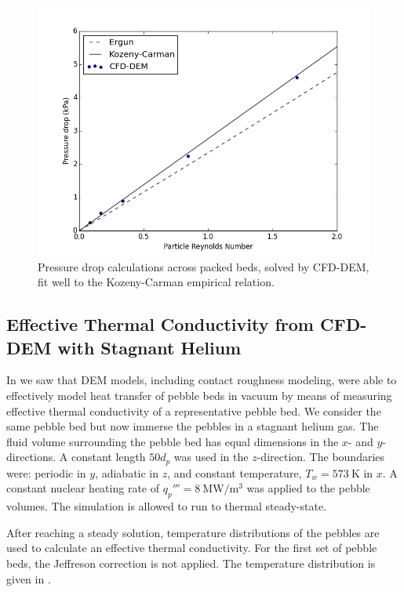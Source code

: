 \begin{figure}
\centering
\includegraphics[width=.7\textwidth]{figures/pressureDrops-full.png}
\caption{Pressure drop calculations across packed beds, solved by CFD-DEM, fit well to the Kozeny-Carman empirical relation.}\label{fig:cfdem-pressure-drop}
\end{figure}


\FloatBarrier
\subsection{Effective Thermal Conductivity from CFD-DEM with Stagnant Helium}\label{sec:cfd-dem-effective-conductivity}
In  we saw that DEM models, including contact roughness modeling, were able to effectively model heat transfer of pebble beds in vacuum by means of measuring effective thermal conductivity of a representative pebble bed. We consider the same pebble bed but now immerse the pebbles in a stagnant helium gas. The fluid volume surrounding the pebble bed has equal dimensions in the $x$- and $y$-directions. A constant length $50d_p$ was used in the $z$-direction. The boundaries were: periodic in $y$, adiabatic in $z$, and constant temperature, $T_w = \SI{573}{\kelvin}$ in $x$. A constant nuclear heating rate of $q_p'''=\SI{8}{\mega\watt\per\cubic\meter}$ was applied to the pebble volumes. The simulation is allowed to run to thermal steady-state. 

After reaching a steady solution, temperature distributions of the pebbles are used to calculate an effective thermal conductivity. For the first set of pebble beds, the Jeffreson correction is not applied. The temperature distribution is given in . 

